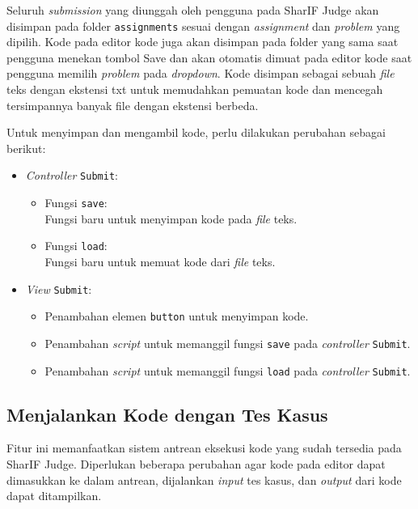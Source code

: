 Seluruh \textit{submission} yang diunggah oleh pengguna pada SharIF Judge akan disimpan pada folder \verb|assignments| sesuai dengan \textit{assignment} dan \textit{problem} yang dipilih. Kode pada editor kode juga akan disimpan pada folder yang sama saat pengguna menekan tombol Save dan akan otomatis dimuat pada editor kode saat pengguna memilih \textit{problem} pada \textit{dropdown}. Kode disimpan sebagai sebuah \textit{file} teks dengan ekstensi txt untuk memudahkan pemuatan kode dan mencegah tersimpannya banyak file dengan ekstensi berbeda.

Untuk menyimpan dan mengambil kode, perlu dilakukan perubahan sebagai berikut:
\begin{itemize}
	\item \textit{Controller} \verb|Submit|:
    \begin{itemize}
		\item Fungsi \verb|save|: \\ Fungsi baru untuk menyimpan kode pada \textit{file} teks.
		\item Fungsi \verb|load|: \\ Fungsi baru untuk memuat kode dari \textit{file} teks.
    \end{itemize}
    \item \textit{View} \verb|Submit|:
    \begin{itemize}
        \item Penambahan elemen \verb|button| untuk menyimpan kode.
        \item Penambahan \textit{script} untuk memanggil fungsi \verb|save| pada \textit{controller} \verb|Submit|. 
        \item Penambahan \textit{script} untuk memanggil fungsi \verb|load| pada \textit{controller} \verb|Submit|. 
    \end{itemize}
\end{itemize}

\subsection{Menjalankan Kode dengan Tes Kasus}
\label{subsec:4:jalan}

Fitur ini memanfaatkan sistem antrean eksekusi kode yang sudah tersedia pada SharIF Judge.
Diperlukan beberapa perubahan agar kode pada editor dapat dimasukkan ke dalam antrean, dijalankan \textit{input} tes kasus, dan \textit{output} dari kode dapat ditampilkan.

